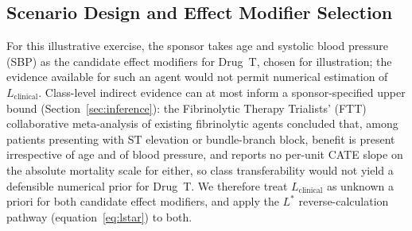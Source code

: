 \documentclass[AMA,Times1COL]{WileyNJDv5}
\begin{document}
\subsection{Scenario Design and Effect Modifier Selection}\label{sec:app_scenario}

For this illustrative exercise, the sponsor takes age and systolic blood pressure (SBP) as the candidate effect modifiers for Drug~T, chosen for illustration; the evidence available for such an agent would not permit numerical estimation of $L_{\text{clinical}}$. Class-level indirect evidence can at most inform a sponsor-specified upper bound (Section~\ref{sec:inference}): the Fibrinolytic Therapy Trialists' (FTT) collaborative meta-analysis of existing fibrinolytic agents\cite{ftt1994} concluded that, among patients presenting with ST elevation or bundle-branch block, benefit is present irrespective of age and of blood pressure, and reports no per-unit CATE slope on the absolute mortality scale for either, so class transferability would not yield a defensible numerical prior for Drug~T.
We therefore treat $L_{\text{clinical}}$ as unknown a priori for both candidate effect modifiers, and apply the $L^*$ reverse-calculation pathway (equation~\ref{eq:lstar}) to both.
\end{document}
